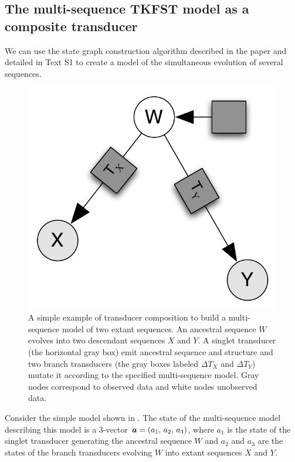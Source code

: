 \documentclass[10pt]{article}
\begin{document}
\subsection{The multi-sequence TKFST model as a composite transducer}

We can use the state graph construction algorithm described 
in the paper and detailed in Text S1 to create a model of the simultaneous evolution
of several sequences.

\begin{figure}[!htb]
  \centering
  \includegraphics [scale=0.4] {figs/parent.pdf}
  \caption{
    A simple example of transducer composition to build a multi-sequence model of two extant sequences.
    An ancestral sequence $W$ evolves into two descendant sequences $X$ and $Y$.
    A singlet transducer (the horizontal gray box) emit ancestral sequence and structure
    and two branch transducers (the gray boxes labeled $\Delta T_X$ and $\Delta T_Y$)
    mutate it according to the specified multi-sequence model.
    Gray nodes correspond to observed data and white nodes unobserved data.
  }
\end{figure}

Consider the simple model shown in .
The state of the multi-sequence model describing this model is a 3-vector $\boldsymbol{a} = \left( a_1,\,a_2,\,a_3 \right)$,
where $a_1$ is the state of the singlet transducer generating the ancestral sequence $W$
and $a_2$ and $a_3$ are the states of the branch transducers evolving $W$ into
extant sequences $X$ and $Y$.
\end{document}
